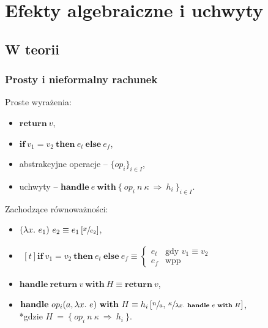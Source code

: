 \documentclass[polish, 13pt, usenames, dvipsnames]{beamer}
\begin{document}

\section{Efekty algebraiczne i uchwyty}

\subsection{W teorii}

\newcommand{\return}[1]{\mathbf{return}\ #1}
\newcommand{\op}[3]{#1(#2, #3)}
\newcommand{\opi}[3]{\op{op_{#1}}{#2}{#3}}
\newcommand{\handle}[2]{\mathbf{handle}\ #1\ \mathbf{with}\ #2}
\newcommand{\hcase}[3]{#1\ #2\ \Rightarrow\ #3}
\newcommand{\fun}[2]{\lambda #1.\ #2}
\newcommand{\cond}[3]{\mathbf{if}\ #1\ \mathbf{then}\ #2\ \mathbf{else}\ #3}

\begin{frame}
  \frametitle{Prosty i nieformalny rachunek}
  Proste wyrażenia:
  \begin{itemize}
  \item \(\return{v}\),
  \item \(\cond{v_1 = v_2}{e_t}{e_f}\),
  \item abstrakcyjne operacje -- \(\{op_i\}_{i \in I}\),
  \item uchwyty -- \(\handle{e}{\{\ \hcase{op_i}{n\ \kappa}{h_i}\ \}_{i \in I}}\).
  \end{itemize}

  \pause
  \vspace{.5em}

  Zachodzące równoważności:
  \begin{itemize}
    \item \((\fun{x}{e_1})\ e_2 \equiv e_1 \left[\sfrac{x}{e_2}\right]\),
    \item
      \(\begin{aligned}[t]
      \cond{v_1 = v_2}{e_t}{e_f} \equiv \left\{\begin{matrix}
      e_t & \text{gdy }v_1 \equiv v_2 \\
      e_f & \text{wpp}
      \end{matrix}\right.
      \end{aligned}\)
    \item \(\handle{\return v}{H} \equiv \return v\),
    \item \(\handle{\opi{i}{a}{\fun{x}{e}}}{H} \equiv h_i \left[\sfrac{n}{a},\, \sfrac{\kappa}{\fun{x}{\handle{e}{H}}}\right] \), \\*gdzie \(H~=~\{\ \hcase{op_i}{n\ \kappa}{h_i} \ \}\).
  \end{itemize}
\end{frame}
\end{document}
